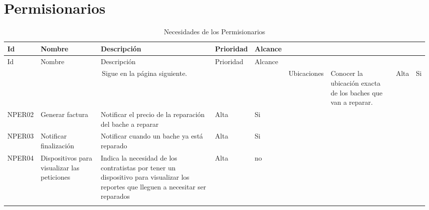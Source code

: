 \section {Permisionarios}
\begin{longtable}{|m{1.5cm}|m{3cm}|m{5cm}|m{2cm}| m{2cm}|}
        \rowcolor[HTML]{3531FF} 
        {\color[HTML]{FFFFFF} Id} &{\color[HTML]{FFFFFF}Nombre} & {\color[HTML]{FFFFFF} Descripción} & {\color[HTML]{FFFFFF}Prioridad} & {\color[HTML]{FFFFFF}Alcance}  \\
        \hline
        \endfirsthead
        \hline
        \rowcolor[HTML]{3531FF} 
        {\color[HTML]{FFFFFF} Id} &{\color[HTML]{FFFFFF}Nombre} & {\color[HTML]{FFFFFF} Descripción} & {\color[HTML]{FFFFFF}Prioridad} & {\color[HTML]{FFFFFF}Alcance}  \\
        \hline 
        \endhead
        \multicolumn{5}{c}{Sigue en la página siguiente.}
        \endfoot
        \endlastfoot
        NPER01 & Ubicaciones & Conocer la ubicación exacta de los baches que van a reparar. & Alta  & Si \\ \hline
        
        NPER02 & Generar factura & Notificar el precio de la reparación del bache a reparar & Alta  & Si \\ \hline
        
        NPER03 & Notificar finalización & Notificar cuando un bache ya está reparado & Alta  & Si \\ \hline
        
        NPER04 & Dispositivos para visualizar las peticiones & Indica la necesidad de los contratistas por tener un dispositivo para visualizar los reportes que lleguen a necesitar ser reparados & Alta & no \\ \hline
        
    \caption{Necesidades de los Permisionarios}
    \label{tab:PERs}
\end{longtable}


